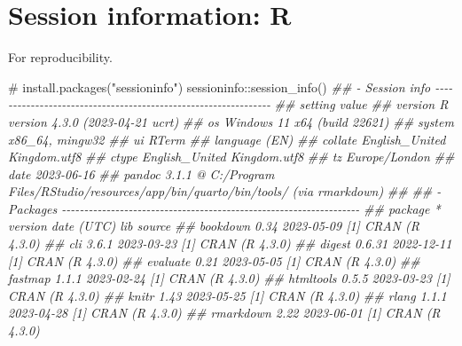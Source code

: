 \documentclass[
  10pt,
  a4paper,
]{book}
\newenvironment{Shaded}{\begin{snugshade}}{\end{snugshade}}
\newcommand{\CommentTok}[1]{\textcolor[rgb]{0.37,0.37,0.37}{#1}}
\newcommand{\DocumentationTok}[1]{\textcolor[rgb]{0.37,0.37,0.37}{\textit{#1}}}
\newcommand{\FunctionTok}[1]{\textcolor[rgb]{0.28,0.35,0.67}{#1}}
\newcommand{\NormalTok}[1]{\textcolor[rgb]{0.00,0.46,0.62}{#1}}
\newcommand{\SpecialCharTok}[1]{\textcolor[rgb]{0.37,0.37,0.37}{#1}}
\begin{document}
\hypertarget{session-information-r}{%
\chapter*{Session information: R}\label{session-information-r}}

For reproducibility.

\begin{Shaded}
\begin{Highlighting}[]
\CommentTok{\# install.packages("sessioninfo")}
\NormalTok{sessioninfo}\SpecialCharTok{::}\FunctionTok{session\_info}\NormalTok{()}
\DocumentationTok{\#\# {-} Session info {-}{-}{-}{-}{-}{-}{-}{-}{-}{-}{-}{-}{-}{-}{-}{-}{-}{-}{-}{-}{-}{-}{-}{-}{-}{-}{-}{-}{-}{-}{-}{-}{-}{-}{-}{-}{-}{-}{-}{-}{-}{-}{-}{-}{-}{-}{-}{-}{-}{-}{-}{-}{-}{-}{-}{-}{-}{-}{-}{-}{-}{-}{-}}
\DocumentationTok{\#\#  setting  value}
\DocumentationTok{\#\#  version  R version 4.3.0 (2023{-}04{-}21 ucrt)}
\DocumentationTok{\#\#  os       Windows 11 x64 (build 22621)}
\DocumentationTok{\#\#  system   x86\_64, mingw32}
\DocumentationTok{\#\#  ui       RTerm}
\DocumentationTok{\#\#  language (EN)}
\DocumentationTok{\#\#  collate  English\_United Kingdom.utf8}
\DocumentationTok{\#\#  ctype    English\_United Kingdom.utf8}
\DocumentationTok{\#\#  tz       Europe/London}
\DocumentationTok{\#\#  date     2023{-}06{-}16}
\DocumentationTok{\#\#  pandoc   3.1.1 @ C:/Program Files/RStudio/resources/app/bin/quarto/bin/tools/ (via rmarkdown)}
\DocumentationTok{\#\# }
\DocumentationTok{\#\# {-} Packages {-}{-}{-}{-}{-}{-}{-}{-}{-}{-}{-}{-}{-}{-}{-}{-}{-}{-}{-}{-}{-}{-}{-}{-}{-}{-}{-}{-}{-}{-}{-}{-}{-}{-}{-}{-}{-}{-}{-}{-}{-}{-}{-}{-}{-}{-}{-}{-}{-}{-}{-}{-}{-}{-}{-}{-}{-}{-}{-}{-}{-}{-}{-}{-}{-}{-}{-}}
\DocumentationTok{\#\#  package     * version date (UTC) lib source}
\DocumentationTok{\#\#  bookdown      0.34    2023{-}05{-}09 [1] CRAN (R 4.3.0)}
\DocumentationTok{\#\#  cli           3.6.1   2023{-}03{-}23 [1] CRAN (R 4.3.0)}
\DocumentationTok{\#\#  digest        0.6.31  2022{-}12{-}11 [1] CRAN (R 4.3.0)}
\DocumentationTok{\#\#  evaluate      0.21    2023{-}05{-}05 [1] CRAN (R 4.3.0)}
\DocumentationTok{\#\#  fastmap       1.1.1   2023{-}02{-}24 [1] CRAN (R 4.3.0)}
\DocumentationTok{\#\#  htmltools     0.5.5   2023{-}03{-}23 [1] CRAN (R 4.3.0)}
\DocumentationTok{\#\#  knitr         1.43    2023{-}05{-}25 [1] CRAN (R 4.3.0)}
\DocumentationTok{\#\#  rlang         1.1.1   2023{-}04{-}28 [1] CRAN (R 4.3.0)}
\DocumentationTok{\#\#  rmarkdown     2.22    2023{-}06{-}01 [1] CRAN (R 4.3.0)}

\end{Highlighting}
\end{Shaded}
\end{document}
